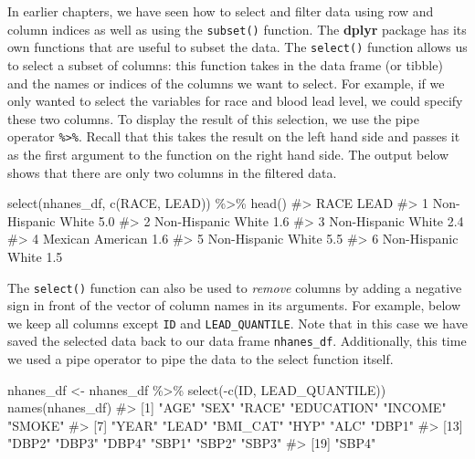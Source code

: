 \documentclass[
  letterpaper,
]{krantz}
\makeatletter
\newenvironment{Shaded}{\begin{snugshade}}{\end{snugshade}}
\newcommand{\CommentTok}[1]{\textcolor[rgb]{0.37,0.37,0.37}{#1}}
\newcommand{\FunctionTok}[1]{\textcolor[rgb]{0.28,0.35,0.67}{#1}}
\newcommand{\NormalTok}[1]{\textcolor[rgb]{0.00,0.23,0.31}{#1}}
\newcommand{\OtherTok}[1]{\textcolor[rgb]{0.00,0.23,0.31}{#1}}
\newcommand{\SpecialCharTok}[1]{\textcolor[rgb]{0.37,0.37,0.37}{#1}}
\newenvironment{kframe}{%
\medskip{}
\setlength{\fboxsep}{.8em}
 \def\at@end@of@kframe{}%
 \ifinner\ifhmode%
  \def\at@end@of@kframe{\end{minipage}}%
  \begin{minipage}{\columnwidth}%
 \fi\fi%
 \def\FrameCommand##1{\hskip\@totalleftmargin \hskip-\fboxsep
 \colorbox{shadecolor}{##1}\hskip-\fboxsep
     \hskip-\linewidth \hskip-\@totalleftmargin \hskip\columnwidth}%
 \MakeFramed {\advance\hsize-\width
   \@totalleftmargin\z@ \linewidth\hsize
   \@setminipage}}%
 {\par\unskip\endMakeFramed%
 \at@end@of@kframe}
\renewenvironment{Shaded}{\begin{kframe}}{\end{kframe}}
\makeatother
\begin{document}
In earlier chapters, we have seen how to select and filter data using
row and column indices as well as using the \texttt{subset()} function.
The \textbf{dplyr} package has its own functions that are useful to
subset the data. The \texttt{select()} function allows us to select a
subset of columns: this function takes in the data frame (or tibble) and
the names or indices of the columns we want to select. For example, if
we only wanted to select the variables for race and blood lead level, we
could specify these two columns. To display the result of this
selection, we use the pipe operator \texttt{\%\textgreater{}\%}. Recall
that this takes the result on the left hand side and passes it as the
first argument to the function on the right hand side. The output below
shows that there are only two columns in the filtered data.

\begin{Shaded}
\begin{Highlighting}[]
\FunctionTok{select}\NormalTok{(nhanes\_df, }\FunctionTok{c}\NormalTok{(RACE, LEAD)) }\SpecialCharTok{\%\textgreater{}\%} \FunctionTok{head}\NormalTok{()}
\CommentTok{\#\textgreater{}                 RACE LEAD}
\CommentTok{\#\textgreater{} 1 Non{-}Hispanic White  5.0}
\CommentTok{\#\textgreater{} 2 Non{-}Hispanic White  1.6}
\CommentTok{\#\textgreater{} 3 Non{-}Hispanic White  2.4}
\CommentTok{\#\textgreater{} 4   Mexican American  1.6}
\CommentTok{\#\textgreater{} 5 Non{-}Hispanic White  5.5}
\CommentTok{\#\textgreater{} 6 Non{-}Hispanic White  1.5}
\end{Highlighting}
\end{Shaded}

The \texttt{select()} function can also be used to \emph{remove} columns
by adding a negative sign in front of the vector of column names in its
arguments. For example, below we keep all columns except \texttt{ID} and
\texttt{LEAD\_QUANTILE}. Note that in this case we have saved the
selected data back to our data frame \texttt{nhanes\_df}. Additionally,
this time we used a pipe operator to pipe the data to the select
function itself.

\begin{Shaded}
\begin{Highlighting}[]
\NormalTok{nhanes\_df }\OtherTok{\textless{}{-}}\NormalTok{ nhanes\_df }\SpecialCharTok{\%\textgreater{}\%} \FunctionTok{select}\NormalTok{(}\SpecialCharTok{{-}}\FunctionTok{c}\NormalTok{(ID, LEAD\_QUANTILE))}
\FunctionTok{names}\NormalTok{(nhanes\_df)}
\CommentTok{\#\textgreater{}  [1] "AGE"       "SEX"       "RACE"      "EDUCATION" "INCOME"    "SMOKE"    }
\CommentTok{\#\textgreater{}  [7] "YEAR"      "LEAD"      "BMI\_CAT"   "HYP"       "ALC"       "DBP1"     }
\CommentTok{\#\textgreater{} [13] "DBP2"      "DBP3"      "DBP4"      "SBP1"      "SBP2"      "SBP3"     }
\CommentTok{\#\textgreater{} [19] "SBP4"}
\end{Highlighting}
\end{Shaded}
\end{document}
